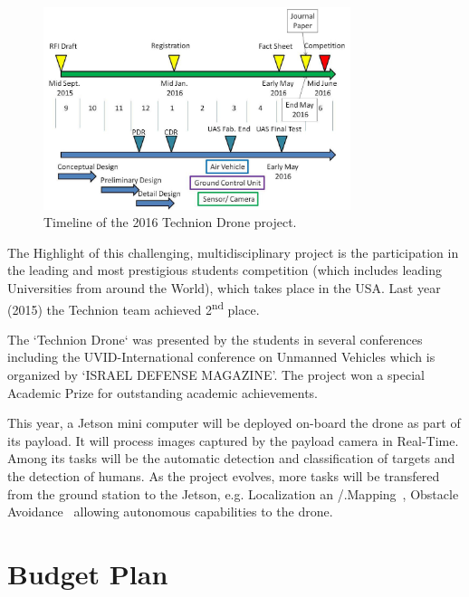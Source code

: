 \documentclass[a4paper]{article} %
\begin{document}
\begin{figure}[h]
	\centering
	\includegraphics[width=0.8\textwidth]{project_timeline}
	\caption{Timeline of the 2016 Technion Drone project.}
	\label{fig:drone}
\end{figure}
The Highlight of this challenging,
multidisciplinary project is the participation in the leading and most
prestigious students competition (which includes leading Universities from around
the World), which takes place in the USA. Last year (2015) the Technion team
achieved 2\textsuperscript{nd} place.

The `Technion Drone` was presented by the students in several conferences
including the UVID-International conference on Unmanned Vehicles which is
organized by `ISRAEL DEFENSE MAGAZINE'. The project won a special Academic Prize
for outstanding academic achievements.

This year, a Jetson mini computer will be deployed on-board the drone as part of
its payload. It will process images captured by the payload camera in Real-Time.
Among its tasks will be the automatic detection and classification of targets
and the detection of humans. As the project evolves, more tasks will be
transfered from the ground station to the Jetson, e.g. Localization an
/.Mapping~\cite{Nardi2014}, Obstacle Avoidance~\cite{Michels2005} allowing
autonomous capabilities to the drone.

\section{Budget Plan}
\end{document}
